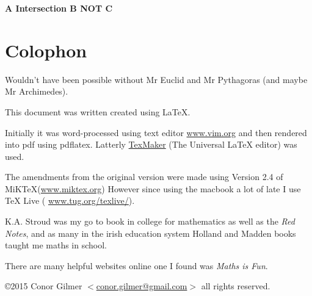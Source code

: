\documentclass{article}
\begin{document}
\textbf{A Intersection B NOT C}
\def \setA{ (0,0) circle (1cm) }
\def \setB{ (1.5,0) circle (1cm) }
\def \setC{ (60:1.5) circle (1cm) }
\def \setU{ (-2, -1.5) rectangle (3.5, 2.75) }
\begin{center}
\end{center}


\newpage
\section{Colophon}

Wouldn't have been possible without Mr Euclid and Mr Pythagoras (and maybe Mr Archimedes).

This document was written created using \LaTeX{}. 

Initially it was word-processed using text editor \href{http://www.vim.org}{www.vim.org} and then rendered into pdf using pdflatex. Latterly \href{http://www.xm1math.net/texmaker}{TexMaker} (The Universal LaTeX editor) was used.

The amendments from the original version were made using Version 2.4 of MiKTeX(\href{http://www.miktex.org}{www.miktex.org})
However since using the macbook a lot of late I use \TeX{} Live ( \href{https://www.tug.org/texlive/}{www.tug.org/texlive/}).




K.A. Stroud\cite{stroudengmath} was my go to book in college for mathematics as well as the \textit{Red Notes}\cite{rednotes}, and as many in the irish education system Holland and Madden books taught me maths\cite{hollandmadden} in school.

There are many helpful websites online one I found was \textit{Maths is Fun}\cite{mathsisfun}.





\copyright 2015 Conor Gilmer $<$\href{mailto:conor.gilmer@gmail.com}{conor.gilmer@gmail.com}$>$ all rights reserved.
\end{document}
